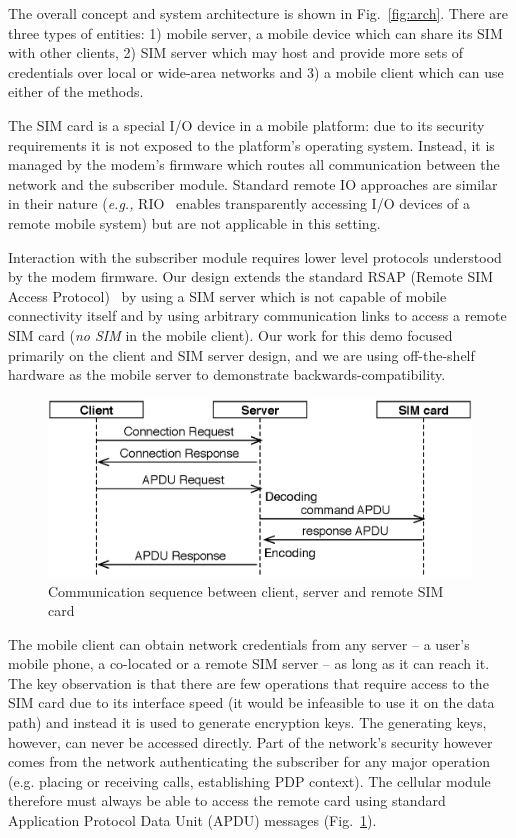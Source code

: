 \documentclass{sig-alternate-2013}
\providecommand{\eg}{\emph{e.g.,} }
\begin{document}
The overall concept and system architecture is shown in Fig.~\ref{fig:arch}. There are three types of entities: 1) mobile server, a mobile device which can share its SIM with other clients, 2) SIM server which may host and provide more sets of credentials over local or wide-area networks and 3) a mobile client which can use either of the methods.

The SIM card is a special I/O device in a mobile platform: due to its security requirements it is not exposed to the platform's operating system. Instead, it is managed by the modem's firmware which routes all communication between the network and the subscriber module. Standard remote IO approaches are similar in their nature (\eg RIO~\cite{Sani:2014hs} enables transparently accessing I/O devices of a remote mobile system) but are not applicable in this setting.

Interaction with the subscriber module requires lower level protocols understood by the modem firmware. Our design extends the standard RSAP (Remote SIM Access Protocol)~\cite{Anonymous:2008vz} by using a SIM server which is not capable of mobile connectivity itself and by using arbitrary communication links to access a remote SIM card (\emph{no SIM} in the mobile client). Our work for this demo focused primarily on the client and SIM server design, and we are using off-the-shelf hardware as the mobile server to demonstrate backwards-compatibility. 

\begin{figure}[t!]
\centering
\includegraphics[width=0.95\columnwidth]{figs/sequence}
\caption{Communication sequence between client, server and remote SIM card}
\label{fig:sequence}
\end{figure}

The mobile client can obtain network credentials from any server -- a user's mobile phone, a co-located or a remote SIM server -- as long as it can reach it. The key observation is that there are few operations that require access to the SIM card due to its interface speed (it would be infeasible to use it on the data path) and instead it is used to generate encryption keys. The generating keys, however, can never be accessed directly. Part of the network's security however comes from the network authenticating the subscriber for any major operation (e.g. placing or receiving calls, establishing PDP context). The cellular module therefore must always be able to access the remote card using standard Application Protocol Data Unit (APDU) messages (Fig.~\ref{fig:sequence}).
\end{document}
